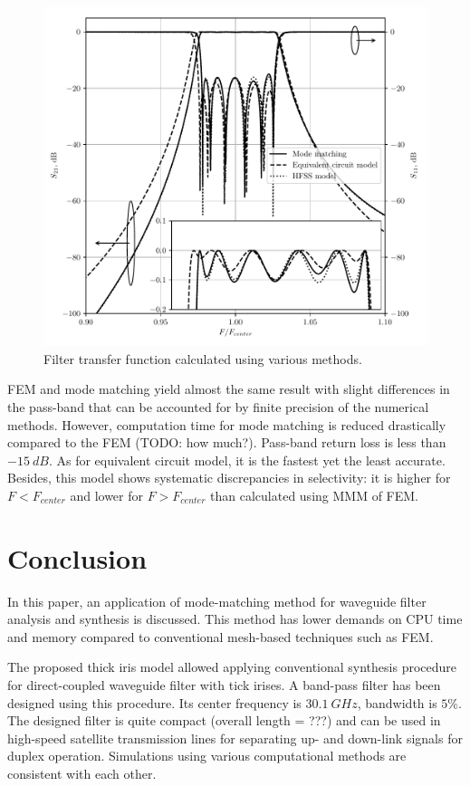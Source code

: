 \documentclass{pj}
\begin{document}
\begin{figure}[h]
  \centering
  \includegraphics{images/reflections}
  \caption{Filter transfer function calculated using various methods.}
  \label{fig:transfer-function} 
\end{figure} 

FEM and mode matching yield almost the same result with slight
differences in the pass-band that can be accounted for by finite
precision of the numerical methods. However, computation time for mode
matching is reduced drastically compared to the FEM (TODO: how
much?). Pass-band return loss is less than $-15~dB$. As for equivalent
circuit model, it is the fastest yet the least accurate. Besides, this
model shows systematic discrepancies in selectivity: it is higher for
$F < F_{center}$ and lower for $F > F_{center}$ than calculated using
MMM of FEM.


\section{Conclusion}
\label{sec:conclusion}
In this paper, an application of mode-matching method for waveguide
filter analysis and synthesis is discussed. This method has lower
demands on CPU time and memory compared to conventional mesh-based
techniques such as FEM.

The proposed thick iris model allowed applying conventional synthesis
procedure for direct-coupled waveguide filter with tick irises. A
band-pass filter has been designed using this procedure. Its center
frequency is $30.1~GHz$, bandwidth is $5\%$. The designed filter is
quite compact (overall length = ???) and can be used in high-speed
satellite transmission lines for separating up- and down-link signals
for duplex operation. Simulations using various computational methods
are consistent with each other.

{}

\end{document}
